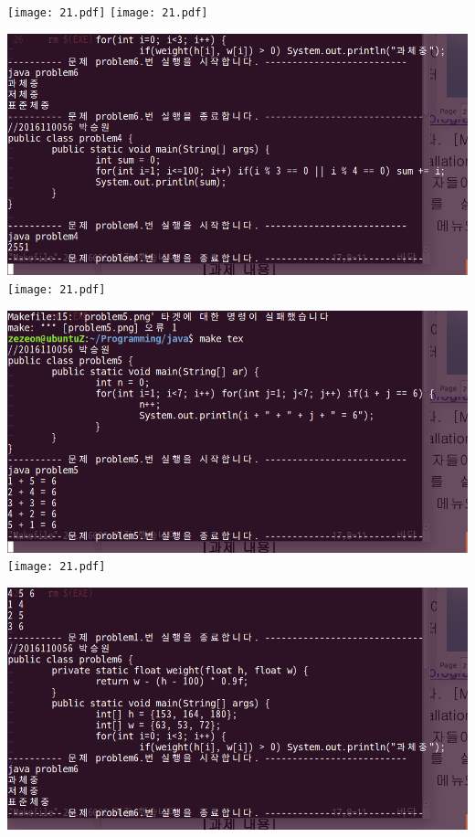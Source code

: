 \documentclass[12pt,a4paper]{article}
\begin{document}
\texttt{[image: 21.pdf]}
\texttt{[image: 21.pdf]}

\includegraphics[width=\textwidth]{problem4.png}
\texttt{[image: 21.pdf]}

\includegraphics[width=\textwidth]{problem5.png}
\texttt{[image: 21.pdf]}

\includegraphics[width=\textwidth]{problem6.png}
\end{document}
